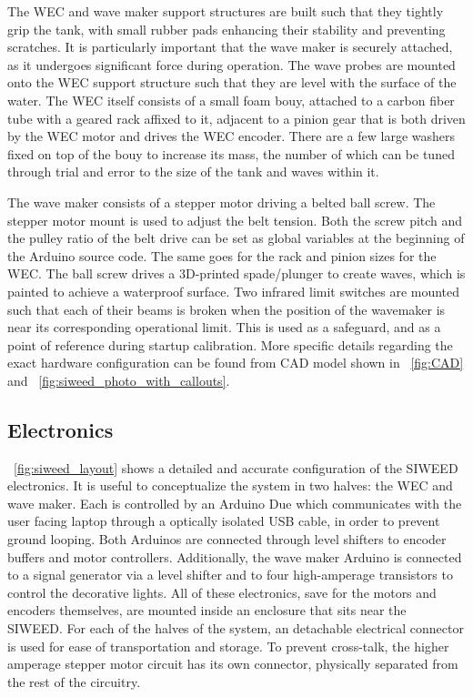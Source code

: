 \documentclass[hardware,article,submit,pdftex,moreauthors]{Definitions/mdpi}
\begin{document}
The WEC and wave maker support structures are built such that they tightly grip the tank, with small rubber pads enhancing their stability and preventing scratches.
It is particularly important that the wave maker is securely attached, as it undergoes significant force during operation.
The wave probes are mounted onto the WEC support structure such that they are level with the surface of the water.
The WEC itself consists of a small foam bouy, attached to a carbon fiber tube with a geared rack affixed to it, adjacent to a pinion gear that is both driven by the WEC motor and drives the WEC encoder.
There are a few large washers fixed on top of the bouy to increase its mass, the number of which can be tuned through trial and error to the size of the tank and waves within it.

The wave maker consists of a stepper motor driving a belted ball screw. 
The stepper motor mount is used to adjust the belt tension.
Both the screw pitch and the pulley ratio of the belt drive can be set as global variables at the beginning of the Arduino source code.
The same goes for the rack and pinion sizes for the WEC.
The ball screw drives a 3D-printed spade/plunger to create waves, which is painted to achieve a waterproof surface.
Two infrared limit switches are mounted such that each of their beams is broken when the position of the wavemaker is near its corresponding operational limit.
This is used as a safeguard, and as a point of reference during startup calibration.
More specific details regarding the exact hardware configuration can be found from CAD model shown in \figurename~\ref{fig:CAD} and \figurename~\ref{fig:siweed_photo_with_callouts}.

\subsection{Electronics}
\figurename~\ref{fig:siweed_layout} shows a detailed and accurate configuration of the SIWEED electronics. 
It is useful to conceptualize the system in two halves: the WEC and wave maker.
Each is controlled by an Arduino Due which communicates with the user facing laptop through a optically isolated USB cable, in order to prevent ground looping.
Both Arduinos are connected through level shifters to encoder buffers and motor controllers.
Additionally, the wave maker Arduino is connected to a signal generator via a level shifter and to four high-amperage transistors to control the decorative lights.
All of these electronics, save for the motors and encoders themselves, are mounted inside an enclosure that sits near the SIWEED. 
For each of the halves of the system, an detachable electrical connector is used for ease of transportation and storage. 
To prevent cross-talk, the higher amperage stepper motor circuit has its own connector, physically separated from the rest of the circuitry.
\end{document}

